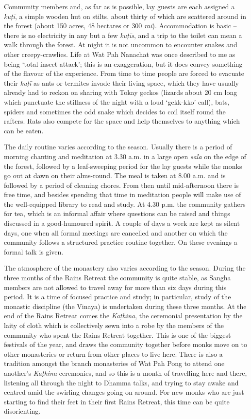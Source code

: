 Community members and, as far as is possible, lay guests are each
assigned a \emph{kuṭī}, a simple wooden hut on stilts, about thirty of
which are scattered around in the forest (about 150 acres, 48 hectares
or 300 \emph{rai}). Accommodation is basic --
there is no electricity in any but a few \emph{kuṭīs}, and a trip to the
toilet can mean a walk through the forest. At night it is not uncommon
to encounter snakes and other creepy-crawlies. Life at Wat Pah Nanachat
was once described to me as being `total insect attack'; this is an
exaggeration, but it does convey something of the flavour of the
experience. From time to time people are forced to evacuate their
\emph{kuṭī} as ants or termites invade their living space, which they
have usually already had to reckon on sharing with Tokay geckos (lizards about
20 cm long which punctuate the stillness of the night with a loud
`gekk-kko' call), bats, spiders and sometimes the odd snake which
decides to coil itself round the rafters. Rats also compete for the
space and help themselves to anything which can be eaten. 

The daily routine varies according to the season. Usually there is a
period of morning chanting and meditation at 3.30 a.m. in a large open
\emph{sāla} on the edge of the forest, followed by a leaf-sweeping
period for the lay guests while the monks go out at dawn on their
alms-round. The meal is taken at 8.00 a.m. and is followed by a period
of cleaning chores. From then until mid-afternoon there is free time, 
and besides spending that time in meditation people will make use of the
well-equipped library to read and study. At 4.30 p.m. the community
gathers for tea, which is an informal affair where questions can be
raised and things discussed in a good-humoured spirit. A couple of days
a week are kept as silent days, one when all formal meetings are
cancelled and another on which the community follows a structured
practice routine together. On these evenings a formal talk is given. 

The atmosphere of the monastery also varies according to the season. 
During the three months of the Rains Retreat the community is quite
stable, as Sangha members are not allowed to travel away for more than
six days during this period. It is a time of focused practice and study; 
in particular, study of the monastic discipline (the Vinaya) is
undertaken during these three months. At the end of the Rains Retreat
comes the \emph{Kaṭhina}, the ceremonial presentation by the laity of
cloth which is collectively sewn into a robe by the members of the
community who spent the Rains Retreat together. This is one of the
biggest festivals of the year, and draws the community together before
monks move on to other monasteries or return from other places to live
here. There is also a tradition amongst the branch monasteries of Wat
Pah Pong to attend one another's \emph{Kaṭhina} ceremonies, and so this is
a month of travelling here and there, listening all through the night to
Dhamma talks, and trying to stay awake and centred amid the swirling
changes going on around. For new monks who are just starting to find
their feet in their first Rains Retreat, this time can be quite
disorienting. 

